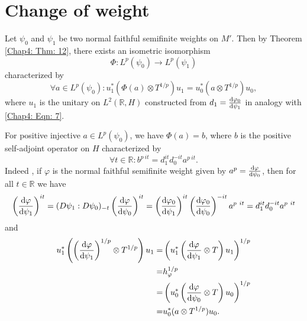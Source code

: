 \section{Change of weight}
Let $\psi_0$ and $\psi_1$ be two normal faithful semifinite weights on $M'$. Then by Theorem \ref{Chap4: Thm: 12}, there exists an isometric isomorphism
\begin{equation}
    \Phi:L^p(\psi_0)\to L^p(\psi_1)
\end{equation}
characterized by
\begin{equation}
    \forall a\in L^p(\psi_0):u_1^*(\Phi(a)\otimes T^{1/p})u_1=u_0^*(a\otimes T^{1/p})u_0,
\end{equation}
where $u_1$ is the unitary on $L^2(\mathbb{R},H)$ constructed from $d_1=\dv{\varphi_0}{\psi_1}$ in analogy with \eqref{Chap4: Eqn: 7}.\par
For positive injective $a\in L^p(\psi_0)$, we have $\Phi(a)=b$, where $b$ is the positive self-adjoint operator on $H$ characterized by
\begin{equation}
    \forall t\in \mathbb{R}: b^{p~it} = d_1^{it}d_0^{-it} a^{p~it}.
\end{equation}
Indeed , if $\varphi$ is the normal faithful semifinite weight given by $a^p=\dv{\varphi}{\psi_0}$, then for all $t\in \mathbb{R}$ we have
\[
    \left( \dv{\varphi}{\psi_1} \right)^{it}=(D\psi_1:D\psi_0)_{-t}\left( \dv{\varphi}{\psi_0} \right)^{it}=\left( \dv{\varphi_0}{\psi_1} \right)^{it}\left( \dv{\varphi_0}{\psi_0} \right)^{-it}a^{p~it}=d_1^{it}d_0^{-it}a^{p~it}
\]
and
\[
    \begin{split}
        u_1^*\left( \left( \dv{\varphi}{\psi_1} \right)^{1/p}\otimes T^{1/p} \right)u_1=&\left( u_1^*\left( \dv{\varphi}{\psi_1}\otimes T \right)u_1 \right)^{1/p}\\
        =&h_\varphi^{1/p}\\
        =&\left( u_0^*\left( \dv{\varphi}{\psi_0}\otimes T \right) u_0 \right)^{1/p}\\
        =&u_0^*(a\otimes T^{1/p})u_0.
    \end{split}
\]
